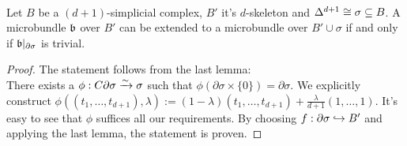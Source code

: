  \\
Let $B$ be a $(d + 1)$-simplicial complex, $B'$ it's $d$-skeleton and $\Delta^{d + 1} \cong \sigma \subseteq{} B$.
A microbundle $\mathfrak{b}$ over $B'$ can be extended to a microbundle over $B' \cup \sigma$ if and only if $\mathfrak{b} \vert_{\partial \sigma}$ is trivial.
\begin{proof}
The statement follows from the last lemma: \\
There exists a $\phi: C\partial \sigma \xrightarrow{\sim} \sigma$ such that $\phi(\partial \sigma \times \{0\}) = \partial \sigma$.
We explicitly construct $\phi((t_1, \dots, t_{d + 1}), \lambda) := (1 - \lambda) (t_1, \dots, t_{d + 1}) + \frac{\lambda}{d + 1} (1, \dots, 1)$.
It's easy to see that $\phi$ suffices all our requirements.
By choosing $f: \partial \sigma \hookrightarrow{} B'$ and applying the last lemma, the statement is proven.
\end{proof}